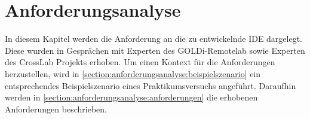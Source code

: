 \chapter{Anforderungsanalyse}\label{section:anforderungsanalyse}

In diesem Kapitel werden die Anforderung an die zu entwickelnde IDE dargelegt. Diese wurden in Gesprächen mit Experten des GOLDi-Remotelab sowie Experten des CrossLab Projekts erhoben. Um einen Kontext für die Anforderungen herzustellen, wird in \autoref{section:anforderungsanalyse:beispielszenario} ein entsprechendes Beispielszenario eines Praktikumsversuchs angeführt. Daraufhin werden in \autoref{section:anforderungsanalyse:anforderungen} die erhobenen Anforderungen beschrieben.



